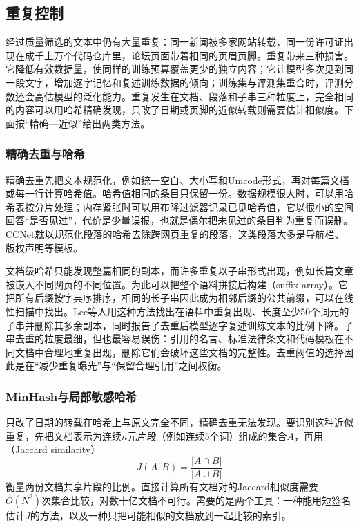 \subsection{重复控制}
\label{sec:nlp-llm-data-dedup}

经过质量筛选的文本中仍有大量重复：同一新闻被多家网站转载，同一份许可证出现在成千上万个代码仓库里，论坛页面带着相同的页眉页脚。重复带来三种损害。它降低有效数据量，使同样的训练预算覆盖更少的独立内容；它让模型多次见到同一段文字，增加逐字记忆和复述训练数据的倾向；训练集与评测集重合时，评测分数还会高估模型的泛化能力。重复发生在文档、段落和子串三种粒度上，完全相同的内容可以用哈希精确发现，只改了日期或页脚的近似转载则需要估计相似度。下面按“精确—近似”给出两类方法。

\subsubsection{精确去重与哈希}
\label{sec:nlp-llm-data-exact-dedup}

精确去重先把文本规范化，例如统一空白、大小写和Unicode形式，再对每篇文档或每一行计算哈希值。哈希值相同的条目只保留一份。数据规模很大时，可以用哈希表按分片处理；内存紧张时可以用布隆过滤器记录已见哈希值，它以很小的空间回答“是否见过”，代价是少量误报，也就是偶尔把未见过的条目判为重复而误删。CCNet就以规范化段落的哈希去除跨网页重复的段落，这类段落大多是导航栏、版权声明等模板。

文档级哈希只能发现整篇相同的副本，而许多重复以子串形式出现，例如长篇文章被嵌入不同网页的不同位置。为此可以把整个语料拼接后构建（suffix array）。它把所有后缀按字典序排序，相同的长子串因此成为相邻后缀的公共前缀，可以在线性扫描中找出。Lee等人用这种方法找出在语料中重复出现、长度至少50个词元的子串并删除其多余副本，同时报告了去重后模型逐字复述训练文本的比例下降。子串去重的粒度最细，但也最容易误伤：引用的名言、标准法律条文和代码模板在不同文档中合理地重复出现，删除它们会破坏这些文档的完整性。去重阈值的选择因此是在“减少重复曝光”与“保留合理引用”之间权衡。

\subsubsection{MinHash与局部敏感哈希}
\label{sec:nlp-llm-data-minhash}

只改了日期的转载在哈希上与原文完全不同，精确去重无法发现。要识别这种近似重复，先把文档表示为连续$n$元片段（例如连续5个词）组成的集合$A$，再用（Jaccard similarity）
\[
  J(A,B)=\frac{|A\cap B|}{|A\cup B|}
\]
衡量两份文档共享片段的比例。直接计算所有文档对的Jaccard相似度需要$O(N^2)$次集合比较，对数十亿文档不可行。需要的是两个工具：一种能用短签名估计$J$的方法，以及一种只把可能相似的文档放到一起比较的索引。

